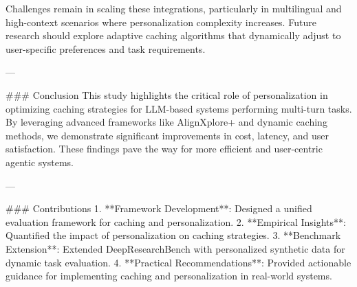 Challenges remain in scaling these integrations, particularly in multilingual and high-context scenarios where personalization complexity increases. Future research should explore adaptive caching algorithms that dynamically adjust to user-specific preferences and task requirements.

---

### Conclusion  
This study highlights the critical role of personalization in optimizing caching strategies for LLM-based systems performing multi-turn tasks. By leveraging advanced frameworks like AlignXplore+ and dynamic caching methods, we demonstrate significant improvements in cost, latency, and user satisfaction. These findings pave the way for more efficient and user-centric agentic systems.

---

### Contributions  
1. **Framework Development**: Designed a unified evaluation framework for caching and personalization.  
2. **Empirical Insights**: Quantified the impact of personalization on caching strategies.  
3. **Benchmark Extension**: Extended DeepResearchBench with personalized synthetic data for dynamic task evaluation.  
4. **Practical Recommendations**: Provided actionable guidance for implementing caching and personalization in real-world systems.